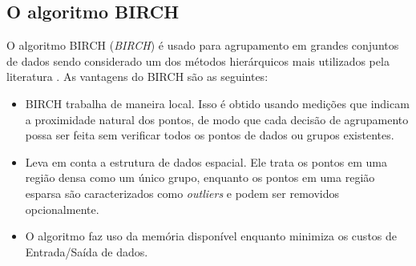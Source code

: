 \begin{figure}[!ht]
	\centering
\end{figure}
\begin{figure}[!ht]
	\centering
\end{figure}

\subsection{O algoritmo BIRCH}
\label{sub:birch}

O algoritmo \acrshort{BIRCH} (\textit{\acrlong{BIRCH}}) é usado para agrupamento em grandes conjuntos de dados sendo considerado um dos métodos hierárquicos mais utilizados pela literatura \cite{Zhang1996}. As vantagens do \acrshort{BIRCH} são as seguintes:

\begin{itemize}
	\item \acrshort{BIRCH} trabalha de maneira local. Isso é obtido usando medições que indicam a proximidade natural dos pontos, de modo que cada decisão de agrupamento possa ser feita sem verificar todos os pontos de dados ou grupos existentes.
	\item Leva em conta a estrutura de dados espacial. Ele trata os pontos em uma região densa como um único grupo, enquanto os pontos em uma região esparsa são caracterizados como \textit{outliers} e podem ser removidos opcionalmente.
	\item O algoritmo faz uso da memória disponível enquanto minimiza os custos de Entrada/Saída de dados.
\end{itemize}

